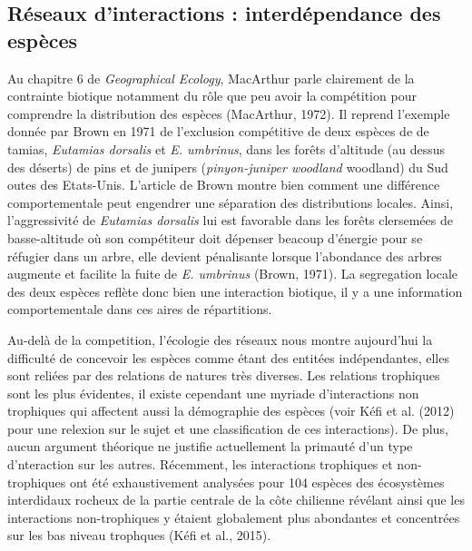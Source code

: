 \subsection*{Réseaux d'interactions : interdépendance des
espèces}\label{ruxe9seaux-dinteractions-interduxe9pendance-des-espuxe8ces}

Au chapitre 6 de \emph{Geographical Ecology}, MacArthur parle clairement
de la contrainte biotique notamment du rôle que peu avoir la compétition
pour comprendre la distribution des espèces (MacArthur, 1972). Il
reprend l'exemple donnée par Brown en 1971 de l'exclusion compétitive de
deux espèces de de tamias, \emph{Eutamias dorsalis} et \emph{E.
umbrinus}, dans les forêts d'altitude (au dessus des déserts) de pins et
de junipers (\emph{pinyon-juniper woodland} woodland) du Sud outes des
Etats-Unis. L'article de Brown montre bien comment une différence
comportementale peut engendrer une séparation des distributions locales.
Ainsi, l'aggressivité de \emph{Eutamias dorsalis} lui est favorable dans
les forêts clersemées de basse-altitude où son compétiteur doit dépenser
beacoup d'énergie pour se réfugier dans un arbre, elle devient
pénalisante lorsque l'abondance des arbres augmente et facilite la fuite
de \emph{E. umbrinus} (Brown, 1971). La segregation locale des deux
espèces reflète donc bien une interaction biotique, il y a une
information comportementale dans ces aires de répartitions.

Au-delà de la competition, l'écologie des réseaux nous montre
aujourd'hui la difficulté de concevoir les espèces comme étant des
entitées indépendantes, elles sont reliées par des relations de natures
très diverses. Les relations trophiques sont les plus évidentes, il
existe cependant une myriade d'interactions non trophiques qui affectent
aussi la démographie des espèces (voir Kéfi et al. (2012) pour une
relexion sur le sujet et une classification de ces interactions). De
plus, aucun argument théorique ne justifie actuellement la primauté d'un
type d'nteraction sur les autres. Récemment, les interactions trophiques
et non-trophiques ont été exhaustivement analysées pour 104 espèces des
écosystèmes interdidaux rocheux de la partie centrale de la côte
chilienne révélant ainsi que les interactions non-trophiques y étaient
globalement plus abondantes et concentrées sur les bas niveau trophques
(Kéfi et al., 2015).

